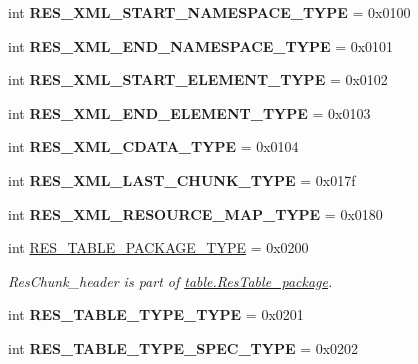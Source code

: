 \begin{DoxyCompactItemize}
int {\bfseries R\+E\+S\+\_\+\+X\+M\+L\+\_\+\+S\+T\+A\+R\+T\+\_\+\+N\+A\+M\+E\+S\+P\+A\+C\+E\+\_\+\+T\+Y\+PE} = 0x0100
\item 
\mbox{\label{classarsc_1_1types_1_1ResourceType_a2a9cbb196e182bf913c04758cac9e0ed}} 
int {\bfseries R\+E\+S\+\_\+\+X\+M\+L\+\_\+\+E\+N\+D\+\_\+\+N\+A\+M\+E\+S\+P\+A\+C\+E\+\_\+\+T\+Y\+PE} = 0x0101
\item 
\mbox{\label{classarsc_1_1types_1_1ResourceType_ad3eb3f46404de1ac0f632a3e3a901df3}} 
int {\bfseries R\+E\+S\+\_\+\+X\+M\+L\+\_\+\+S\+T\+A\+R\+T\+\_\+\+E\+L\+E\+M\+E\+N\+T\+\_\+\+T\+Y\+PE} = 0x0102
\item 
\mbox{\label{classarsc_1_1types_1_1ResourceType_a82d25885a2d13b186763931fb30846a0}} 
int {\bfseries R\+E\+S\+\_\+\+X\+M\+L\+\_\+\+E\+N\+D\+\_\+\+E\+L\+E\+M\+E\+N\+T\+\_\+\+T\+Y\+PE} = 0x0103
\item 
\mbox{\label{classarsc_1_1types_1_1ResourceType_ae4c63892ff4be212922ad684c0025481}} 
int {\bfseries R\+E\+S\+\_\+\+X\+M\+L\+\_\+\+C\+D\+A\+T\+A\+\_\+\+T\+Y\+PE} = 0x0104
\item 
\mbox{\label{classarsc_1_1types_1_1ResourceType_a061827387bff8ae6bb638f8a924019b8}} 
int {\bfseries R\+E\+S\+\_\+\+X\+M\+L\+\_\+\+L\+A\+S\+T\+\_\+\+C\+H\+U\+N\+K\+\_\+\+T\+Y\+PE} = 0x017f
\item 
\mbox{\label{classarsc_1_1types_1_1ResourceType_a7cc8625b2cfa04a8bf8b84202f48b9c6}} 
int {\bfseries R\+E\+S\+\_\+\+X\+M\+L\+\_\+\+R\+E\+S\+O\+U\+R\+C\+E\+\_\+\+M\+A\+P\+\_\+\+T\+Y\+PE} = 0x0180
\item 
\mbox{\label{classarsc_1_1types_1_1ResourceType_a7f0f847a140ef051b215febe579a0165}} 
int \mbox{\hyperlink{classarsc_1_1types_1_1ResourceType_a7f0f847a140ef051b215febe579a0165}{R\+E\+S\+\_\+\+T\+A\+B\+L\+E\+\_\+\+P\+A\+C\+K\+A\+G\+E\+\_\+\+T\+Y\+PE}} = 0x0200
\begin{DoxyCompactList}\small\item\em Res\+Chunk\+\_\+header is part of \mbox{\hyperlink{}{table.\+Res\+Table\+\_\+package}}. \end{DoxyCompactList}\item 
\mbox{\label{classarsc_1_1types_1_1ResourceType_ab31998b94a6b145433a8f3836ef7a118}} 
int {\bfseries R\+E\+S\+\_\+\+T\+A\+B\+L\+E\+\_\+\+T\+Y\+P\+E\+\_\+\+T\+Y\+PE} = 0x0201
\item 
\mbox{\label{classarsc_1_1types_1_1ResourceType_ad482bca4a4ce39083b2b55b3635b351f}} 
int {\bfseries R\+E\+S\+\_\+\+T\+A\+B\+L\+E\+\_\+\+T\+Y\+P\+E\+\_\+\+S\+P\+E\+C\+\_\+\+T\+Y\+PE} = 0x0202
\end{DoxyCompactItemize}
